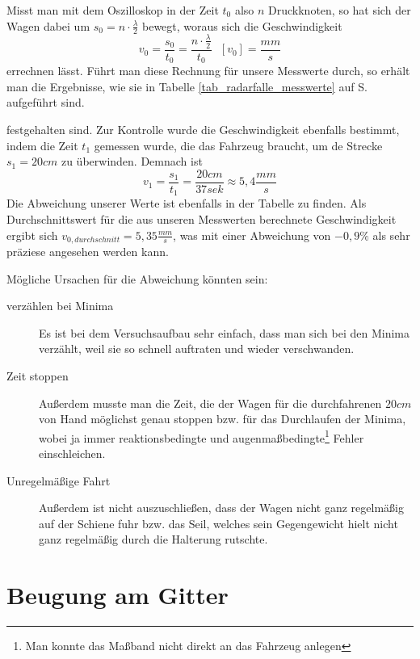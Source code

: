 Misst man mit dem Oszilloskop in der Zeit \(t_0\) also \(n\) Druckknoten, so hat sich der Wagen dabei um \(s_0 = n \cdot \frac{\lambda}{2}\) bewegt, woraus sich die Geschwindigkeit 
\begin{equation}
   v_0 = \frac{s_0}{t_0} = \frac{n \cdot \frac{\lambda}{2}}{t_0} ~~~ [v_0] = \frac{mm}{s}
\end{equation}
errechnen lässt. Führt man diese Rechnung für unsere Messwerte durch, so erhält man die Ergebnisse, wie sie in Tabelle \ref{tab_radarfalle_messwerte} auf S. \pageref{tab_radarfalle_messwerte} aufgeführt sind.

festgehalten sind. Zur Kontrolle wurde die Geschwindigkeit ebenfalls bestimmt, indem die Zeit \(t_1\) gemessen wurde, die das Fahrzeug braucht, um de Strecke \(s_1 = 20cm\) zu überwinden. Demnach ist 
\[
   v_1 = \frac{s_1}{t_1} = \frac{20cm}{37sek} \approx 5,4 \frac{mm}{s}
\]
Die Abweichung unserer Werte ist ebenfalls in der Tabelle zu finden. Als Durchschnittswert für die aus unseren Messwerten berechnete Geschwindigkeit ergibt sich \(v_{0,durchschnitt} = 5,35 \frac{mm}{s}\), was mit einer Abweichung von \(-0,9\%\) als sehr präziese angesehen werden kann. 

Mögliche Ursachen für die Abweichung könnten sein:
 \begin{description}
    \item[verzählen bei Minima] Es ist bei dem Versuchsaufbau sehr einfach, dass man sich bei den Minima verzählt, weil sie so schnell auftraten und wieder verschwanden. 
    \item[Zeit stoppen] Außerdem musste man die Zeit, die der Wagen für die durchfahrenen \(20cm\) von Hand möglichst genau stoppen bzw. für das Durchlaufen der Minima, wobei ja immer reaktionsbedingte und augenmaßbedingte\footnote{Man konnte das Maßband nicht direkt an das Fahrzeug anlegen} Fehler einschleichen. 
    \item[Unregelmäßige Fahrt] Außerdem ist nicht auszuschließen, dass der Wagen nicht ganz regelmäßig auf der Schiene fuhr bzw. das Seil, welches sein Gegengewicht hielt nicht ganz regelmäßig durch die Halterung rutschte.
 \end{description}









			\section{Beugung am Gitter}



